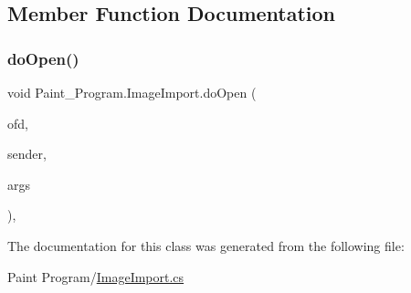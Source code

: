 \subsection{Member Function Documentation}
\mbox{\label{class_paint___program_1_1_image_import_ae00dcd97307687b44917c11645487a1a}} 
\subsubsection{\texorpdfstring{do\+Open()}{doOpen()}}
{\footnotesize\ttfamily void Paint\+\_\+\+Program.\+Image\+Import.\+do\+Open (\begin{DoxyParamCaption}\item[{Open\+File\+Dialog}]{ofd,  }\item[{object}]{sender,  }\item[{Do\+Work\+Event\+Args}]{args }\end{DoxyParamCaption})\hspace{0.3cm}{\ttfamily [inline]}, {\ttfamily [private]}}



The documentation for this class was generated from the following file\+:\begin{DoxyCompactItemize}
\item 
Paint Program/\mbox{\hyperlink{_image_import_8cs}{Image\+Import.\+cs}}\end{DoxyCompactItemize}
